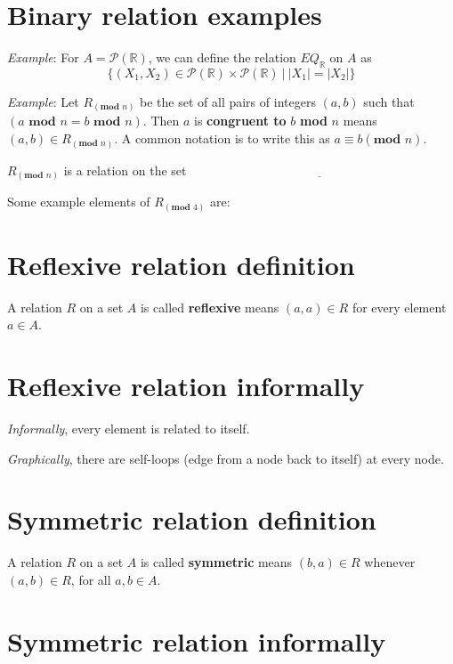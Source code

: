 \documentclass[12pt, oneside]{article}
\begin{document}
\vspace{100pt} \vfill
\section*{Binary relation examples}


{\it Example}: For $A = \mathcal{P}(\mathbb{R})$, we can define the relation $EQ_{\mathbb{R}}$ on $A$ as 
\[
\{ (X_1, X_2 ) \in\mathcal{P}(\mathbb{R})  \times \mathcal{P}(\mathbb{R}) ~|~ |X_1| = |X_2| \}
\]

\vspace{50pt}

{\it Example}: Let $R_{(\textbf{mod } n)}$ be the set of all pairs of integers $(a, b)$ such that $(a \textbf{ mod } n = b \textbf{ mod } n)$.
Then $a$ is {\bf congruent to} $b$ \textbf{mod} $n$ means $(a, b) \in R_{(\textbf{mod } n)}$. A common notation is to write this as $a \equiv b (\textbf{mod } n)$.


$R_{(\textbf{mod } n)}$ is a relation on the set $\underline{\phantom{\mathbb{Z}}\hspace{20em}}$


Some example elements of $R_{(\textbf{mod } 4)}$ are: 

\vspace{50pt} \vfill
\section*{Reflexive relation definition}


A relation $R$ on a set $A$ is called {\bf reflexive} 
means $(a, a) \in R$ for every element $a \in A$. 
 \vfill
\section*{Reflexive relation informally}


{\it Informally}, every element is related to itself.

{\it Graphically}, there are self-loops (edge from a node back to itself) at 
every node. \vfill
\section*{Symmetric relation definition}


A relation $R$ on a set $A$ is called {\bf symmetric} means 
$(b, a) \in R$ whenever $(a, b) \in R$, for all $a, b \in A$. 
 \vfill
\section*{Symmetric relation informally}
\end{document}
